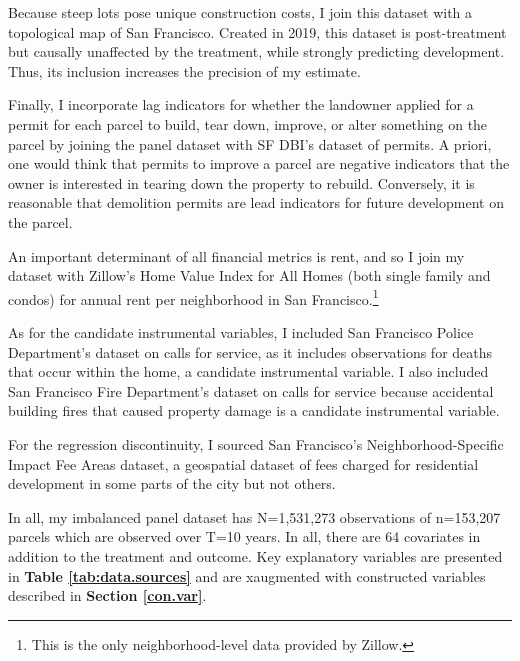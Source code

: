 \documentclass[a4paper,12pt]{article}
\begin{document}
Because steep lots pose unique construction costs, I join this dataset with a topological map of San Francisco. Created in 2019, this dataset is post-treatment but causally unaffected by the treatment, while strongly predicting development. Thus, its inclusion increases the precision of my estimate.

Finally, I incorporate lag indicators for whether the landowner applied for a permit for each parcel to build, tear down, improve, or alter something on the parcel by joining the panel dataset with SF DBI's dataset of permits. A priori, one would think that permits to improve a parcel are negative indicators that the owner is interested in tearing down the property to rebuild. Conversely, it is reasonable that demolition permits are lead indicators for future development on the parcel.

An important determinant of all financial metrics is rent, and so I join my dataset with Zillow's Home Value Index for All Homes (both single family and condos) for annual rent per neighborhood in San Francisco.\footnote{This is the only neighborhood-level data provided by Zillow.}

As for the candidate instrumental variables, I included San Francisco Police Department’s dataset on calls for service, as it includes observations for deaths that occur within the home, a candidate instrumental variable. I also included San Francisco Fire Department’s dataset on calls for service because accidental building fires that caused property damage is a candidate instrumental variable.

For the regression discontinuity, I sourced San Francisco's Neighborhood-Specific Impact Fee Areas dataset, a geospatial dataset of fees charged for residential development in some parts of the city but not others.

In all, my imbalanced panel dataset has N=1,531,273 observations of n=153,207 parcels which are observed over T=10 years. In all, there are 64 covariates in addition to the treatment and outcome. Key explanatory variables are presented in \textbf{Table \ref{tab:data.sources}} and are xaugmented with constructed variables described in \textbf{Section \ref{con.var}}. 
\end{document}
